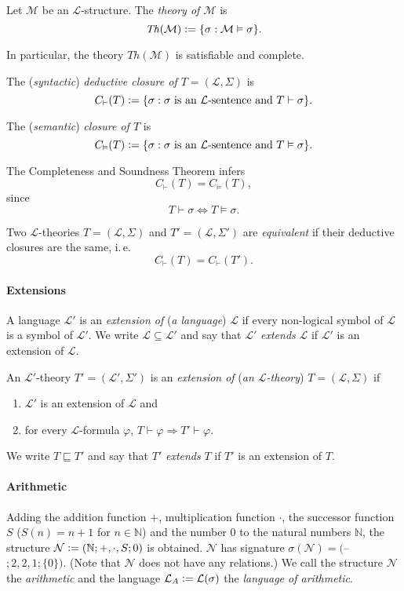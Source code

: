 Let $\mathcal{M}$ be an $\mathcal{L}$-structure. The \textit{theory of $\mathcal{M}$} is
\[\mathit{Th}(\mathcal{M}) \vcentcolon= \lbrace \sigma : \mathcal{M} \vDash \sigma \rbrace.\]

In particular, the theory $\mathit{Th}(\mathcal{M})$ is satisfiable and complete.

The (\textit{syntactic}) \textit{deductive closure of $T = (\mathcal{L}, \Sigma)$} is
\[C_\vdash(T) \vcentcolon= \lbrace \sigma : \sigma \text{ is an }\mathcal{L}\text{-sentence and }T \vdash \sigma \rbrace. \]

The (\textit{semantic}) \textit{closure of $T$} is
\[C_\vDash(T) \vcentcolon= \lbrace \sigma : \sigma \text{ is an }\mathcal{L}\text{-sentence and }T \vDash \sigma \rbrace. \]
 
The Completeness and Soundness Theorem infers \[C_\vdash(T) = C_\vDash(T),\] since \[T \vdash \sigma \Leftrightarrow T \vDash \sigma. \] 

Two $\mathcal{L}$-theories $T = (\mathcal{L}, \Sigma)$ and $T' = (\mathcal{L}, \Sigma')$ are \textit{equivalent} if their deductive closures are the same, i.\,e.\@
\[C_\vdash(T) = C_\vdash(T'). \]

\paragraph{Extensions}
A language $\mathcal{L}'$ is an \textit{extension of }(\textit{a language}) $\mathcal{L}$ if every non-logical symbol of $\mathcal{L}$ is a symbol of $\mathcal{L}'$. We write $\mathcal{L}\subseteq \mathcal{L}'$ and say that $\mathcal{L}'$ \textit{extends} $\mathcal{L}$ if $\mathcal{L}'$ is an extension of $\mathcal{L}$.

An $\mathcal{L}'$-theory $T'= (\mathcal{L}', \Sigma')$ is an \textit{extension of }(\textit{an $\mathcal{L}$-theory}) $T = (\mathcal{L}, \Sigma)$ if 
\begin{enumerate}
\item $\mathcal{L}'$ is an extension of $\mathcal{L}$ and
\item for every $\mathcal{L}$-formula $\varphi$, $T \vdash \varphi \Rightarrow T' \vdash \varphi$.
\end{enumerate} 
We write $T \sqsubseteq T'$ and say that $T'$ \textit{extends} $T$ if $T'$ is an extension of $T$.
\paragraph{Arithmetic}
Adding the addition function $+$, multiplication function $\cdot$, the successor function $S$ ($S(n)=n+1$ for $n \in \mathbb{N}$) and the number $0$ to the natural numbers $\mathbb{N}$, the structure $\mathcal{N} \vcentcolon= ( \mathbb{N}; +, \cdot, S;0 )$ is obtained. $\mathcal{N}$ has signature $\sigma(\mathcal{N}) = ($--$; 2, 2, 1; \lbrace 0 \rbrace )$. (Note that $\mathcal{N}$ does not have any relations.) We call the structure $\mathcal{N}$ the \textit{arithmetic} and the language $\mathcal{L}_A \vcentcolon= \mathcal{L}(\sigma)$ the \textit{language of arithmetic}.

